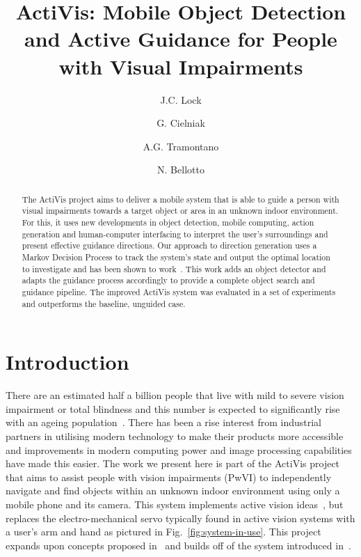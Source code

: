 \documentclass[runningheads]{llncs}
\begin{document}
\title{ActiVis: Mobile Object Detection and Active Guidance for People with Visual Impairments}

\author{J.C. Lock \and
  G. Cielniak \and
  A.G. Tramontano \and
  N. Bellotto
}

\maketitle

\begin{abstract}
  The ActiVis project aims to deliver a mobile system that is able to guide a person with visual impairments towards a target object or area in an unknown indoor environment. 
  For this, it uses new developments in object detection, mobile computing, action generation and human-computer interfacing to interpret the user's surroundings and present effective guidance directions.
  Our approach to direction generation uses a Markov Decision Process to track the system's state and output the optimal location to investigate and has been shown to work~\cite{lock2019active}.
  This work adds an object detector and adapts the guidance process accordingly to provide a complete object search and guidance pipeline.
  The improved ActiVis system was evaluated in a set of experiments and outperforms the baseline, unguided case.
\end{abstract}

\section{Introduction}

There are an estimated half a billion people that live with mild to severe vision impairment or total blindness and this number is expected to significantly rise with an ageing population~\cite{bourne2017magnitude}.
There has been a rise interest from industrial partners in utilising modern technology to make their products more accessible and improvements in modern computing power and image processing capabilities have made this easier.
The work we present here is part of the ActiVis project that aims to assist people with vision impairments (PwVI) to independently navigate and find objects within an unknown indoor environment using only a mobile phone and its camera.
This system implements active vision ideas~\cite{bajcsy2017}, but replaces the electro-mechanical servo typically found in active vision systems with a user's arm and hand as pictured in Fig.~\ref{fig:system-in-use}.
This project expands upon concepts proposed in~\cite{bellotto2013,lock2017portable} and builds off of the system introduced in~\cite{lock2019active}.
\end{document}
